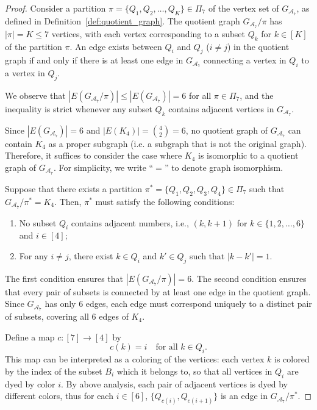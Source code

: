 \documentclass[twoside,11pt]{article}
\newcommand{\partition}{\Pi}
\newcommand{\partitionp}[1]{\partition_{#1}}
\newcommand{\edges}[0]{E}
\newcommand{\edgesp}[1]{E(#1)}
\newcommand{\completegraphp}[1]{K_{#1}}
\newcommand{\graphform}[1]{G_{#1}}
\def\calA{\mathcal{A}}
\begin{document}
\begin{proof}
Consider a partition $\pi = \{Q_1, Q_2, \dots, Q_K\} \in \partitionp{7}$ of the vertex set of $\graphform{\calA_7}$, as defined in Definition~\ref{def:quotient_graph}. 
The quotient graph $\graphform{\calA_7} / \pi$ has $|\pi| = K \le 7$ vertices, with each vertex corresponding to a subset $Q_k$ for $k \in [K]$ of the partition $\pi$. An edge exists between $Q_i$ and $Q_j$ ($i \neq j$) in the quotient graph if and only if there is at least one edge in $\graphform{\calA_7}$ connecting a vertex in $Q_i$ to a vertex in $Q_j$.

We observe that $|\edgesp{\graphform{\calA_7} / \pi}| \le |\edgesp{\graphform{\calA_7}}| = 6$ for all $\pi \in \partitionp{7}$, and the inequality is strict whenever any subset $Q_k$ contains adjacent vertices in $\graphform{\calA_7}$.

Since $|\edges(\graphform{\calA_7})| = 6$ and $|\edges(\completegraphp{4})| = \binom{4}{2} = 6$, no quotient graph of $\graphform{\calA_7}$ can contain $\completegraphp{4}$ as a proper subgraph (i.e. a subgraph that is not the original graph). 
Therefore, it suffices to consider the case where $\completegraphp{4}$ is isomorphic to a quotient graph of $\graphform{\calA_7}$. 
For simplicity, we write ``$=$'' to denote graph isomorphism.

Suppose that there exists a partition $\pi^{*} = \{ Q_1, Q_2, Q_3, Q_4 \} \in \Pi_7$ such that $\graphform{\calA_7} / \pi^{*} = \completegraphp{4}$. 
Then, $\pi^{*}$ must satisfy the following conditions:

\begin{enumerate}
    \item No subset $Q_i$ contains adjacent numbers, i.e., $(k, k+1)$ for $k \in \{1,2,\dots,6\}$ and $i \in [4]$;
    \item For any $i \neq j$, there exist $k \in Q_i$ and $k' \in Q_j$ such that $|k - k'| = 1$.
\end{enumerate}

The first condition ensures that $|\edgesp{\graphform{\calA_7} / \pi}| = 6$. 
The second condition ensures that every pair of subsets is connected by at least one edge in the quotient graph. 
Since $\graphform{\calA_7}$ has only $6$ edges, each edge must correspond uniquely to a distinct pair of subsets, covering all $6$ edges of $\completegraphp{4}$.

Define a map $c: [7] \to [4]$ by
\begin{equation*}
    c(k) = i \quad \text{for all } k \in Q_i.
\end{equation*}
This map can be interpreted as a coloring of the vertices: each vertex $k$ is colored by the index of the subset $B_i$ which it belongs to, so that all vertices in $Q_i$ are dyed by color $i$. By above analysis, each pair of adjacent vertices is dyed by different colors, thus for each $i \in [6]$, $ \{ Q_{c(i)}, Q_{c(i+1)} \}$ is an edge in $\graphform{\calA_7} / \pi^*$.


\end{proof}
\end{document}
